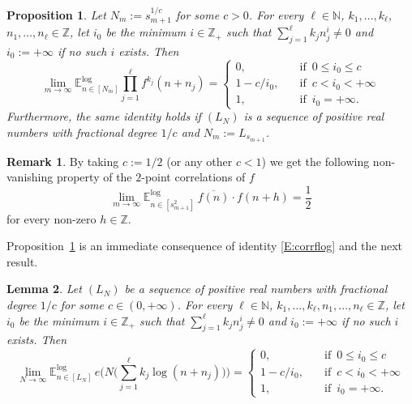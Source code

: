 \documentclass[11pt]{amsart}
\newtheorem{lemma}{Lemma}[section]
\newtheorem{proposition}[lemma]{Proposition}
\theoremstyle{definition}
\newtheorem*{remark}{Remark}
\newcommand{\lE}{\mathbb{E}^{\log}}
\newcommand{\N}{{\mathbb N}}
\newcommand{\Z}{{\mathbb Z}}
\begin{document}
\begin{proposition}\label{P:corrlogc}
	Let $N_m:=s_{m+1}^{1/c}$   for some $c>0$.
	For every $\ell\in\N$, $k_1,\ldots, k_\ell$, $n_1,\ldots, n_\ell \in \Z$,
	let  $i_0$ be the minimum $i\in \Z_+$
	such that $\sum_{j=1}^\ell k_j n_j^i\neq  0$ and $i_0:=+\infty$ if no such   $i$ exists.
	Then
	$$
	\lim_{m\to \infty} 	\lE_{n\in[N_m]}\prod_{j=1}^\ell f^{k_j}(n+n_j)=
	\begin{cases}
		0, & \quad \text{if }\,  0\leq i_0\leq c\\
		1-c/i_0, & \quad   \text{if }\,  c<i_0<+\infty  \\
		1, & \quad \text{if } \, i_0=+\infty.
	\end{cases}
	$$
	Furthermore, the same identity  holds if $(L_N)$ is a sequence of positive real numbers with fractional degree $1/c$ and $N_m:=L_{s_{m+1}}$.
\end{proposition}
\begin{remark}
	By taking $c:=1/2$ (or any other $c<1$)  we get the following
	non-vanishing property of the $2$-point correlations of $f$
	$$
	\lim_{m\to \infty} 	\lE_{n\in[s_{m+1}^2]}\ \overline{f(n)}\cdot f(n+h)=\frac{1}{2}
	$$
	for every non-zero  $h\in \Z$.
\end{remark}
Proposition~\ref{P:corrlogc} is an immediate consequence of  identity \eqref{E:corrflog} and the next result.
  \begin{lemma}\label{L:corrlogc}
	Let $(L_N)$ be a sequence of positive real numbers with fractional  degree $1/c$ for some $c\in (0,+\infty)$.
		For every $\ell\in\N$, $k_1,\ldots, k_\ell, n_1,\ldots, n_\ell \in \Z$,
	let  $i_0$ be the minimum $i\in \Z_+$
	such that $\sum_{j=1}^\ell k_j n_j^i\neq  0$ and $i_0:=+\infty$ if no such   $i$ exists.
	Then
	$$
	\lim_{N\to \infty} 	\lE_{n\in[L_N]}\, e\big(N\big(\sum_{j=1}^\ell k_j \log(n+n_j)\big)\big)=
	\begin{cases}
		0, & \quad \text{if }\,  0\leq i_0\leq c\\
		1-c/i_0, & \quad   \text{if }\,  c<i_0<+\infty  \\
		1, & \quad \text{if } \, i_0=+\infty.
	\end{cases}
	$$
\end{lemma}
\end{document}
